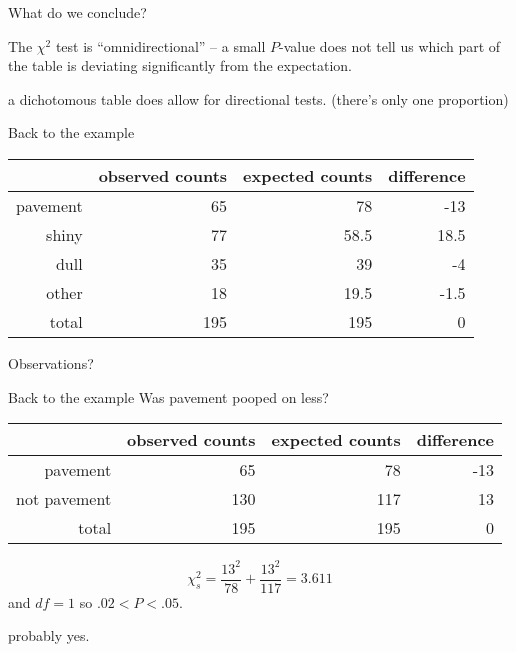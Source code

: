 \begin{frame}{What do we conclude?}

    The $\chi^2$ test is ``omnidirectional'' --
    a small $P$-value does not tell us \alert{which part} of the table
    is deviating significantly from the expectation.

    \vspace{2em}

     a \alert{dichotomous} table does allow for directional tests.
    (there's only one proportion)


\end{frame}


\begin{frame}{Back to the example}
    \begin{center}
        \begin{tabular}{rrrr}
            & observed counts & expected counts & difference \\
            \hline 
            pavement & 65 & 78 & -13 \\
            shiny & 77 & 58.5 & 18.5 \\
            dull & 35 & 39 & -4 \\
            other & 18 & 19.5 & -1.5 \\
            \hline
            total & 195 & 195  & 0 \\
        \end{tabular}
    \end{center}

    \vspace{2em}

    Observations?
\end{frame}


\begin{frame}{Back to the example}
    Was pavement pooped on less?
    \begin{center}
        \begin{tabular}{rrrr}
            & observed counts & expected counts & difference \\
            \hline 
            pavement & 65 & 78 & -13 \\
            not pavement & 130 & 117 & 13 \\
            \hline
            total & 195 & 195  & 0 
        \end{tabular}
    \end{center}

    \vspace{2em}
    
    \[ \chi^2_s = \frac{ 13^2 }{ 78 } + \frac{ 13^2 }{ 117 } = 3.611 \]
    and $df=1$ so $.02<P<.05$.

    \vspace{2em}

     probably yes.


\end{frame}

